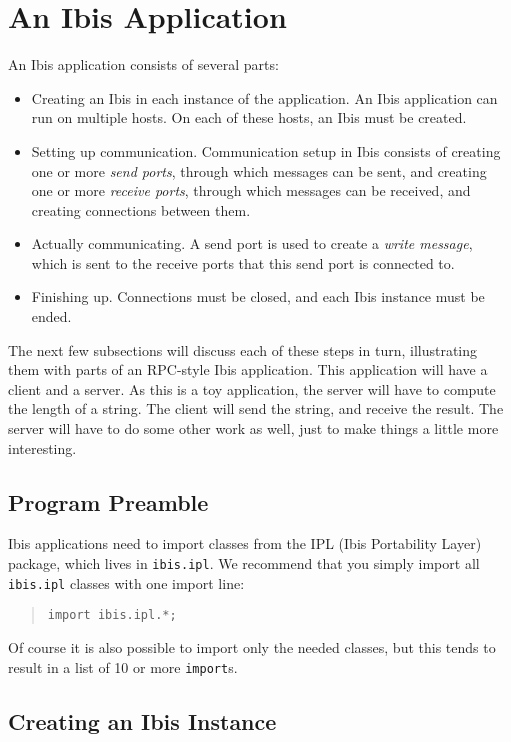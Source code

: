 \documentclass[10pt]{article}
\newcommand{\mysection}[1]{\section{#1}\label{#1}}
\newcommand{\mysubsection}[1]{\subsection{#1}\label{#1}}
\begin{document}
\mysection{An Ibis Application}

An Ibis application consists of several parts:
\begin{itemize}
\item
Creating an Ibis in each instance of the application.
An Ibis application can run on multiple hosts.
On each of these hosts, an Ibis must be created.
\item
Setting up communication. Communication setup in Ibis
consists of creating one or more \emph{send ports}, through which messages
can be sent, and creating one or more \emph{receive ports},
through which messages can be received, and creating connections between them.
\item
Actually communicating. A send port is used to create a 
\emph{write message}, which is sent to the receive ports that this send port
is connected to.
\item
Finishing up. Connections must be closed, and each Ibis instance must
be ended.
\end{itemize}
\noindent
The next few subsections will discuss each of these steps in turn,
illustrating them with parts of an RPC-style Ibis application.
This application will have a client and a server. As this is a toy
application, the server will have to compute the length of a string.
The client will send the string, and receive the result.
The server will have to do some other work as well, just to make
things a little more interesting.

\subsection{Program Preamble}

Ibis applications need to import classes from the IPL (Ibis
Portability Layer) package, which lives in
\texttt{ibis.ipl}.
We recommend that you simply import all \texttt{ibis.ipl} classes with
one import line:
\begin{quote}
\begin{verbatim}
import ibis.ipl.*;
\end{verbatim}
\end{quote}
Of course it is also possible to import only the needed classes, but
this tends to result in a list of 10 or more \texttt{import}s.

\mysubsection{Creating an Ibis Instance}
\end{document}
